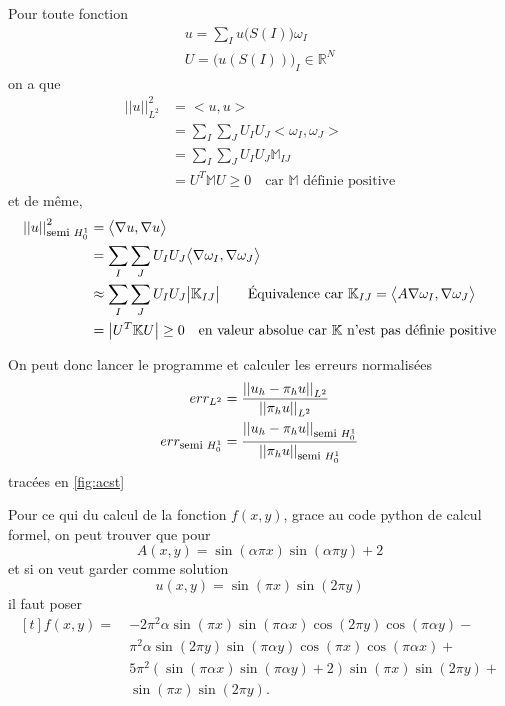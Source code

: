 \documentclass[11pt]{article}
\newcommand{\smbox}[1]{\mbox{\footnotesize #1}}
\newcommand{\R}{\mathbb{R}}
\newcommand{\K}{\mathbb{K}}
\newcommand{\M}{\mathbb{M}}
\newcommand{\norm}[1]{\left|\left|#1\right|\right|}
\begin{document}
Pour toute fonction
\begin{align}
  u = \sum_I u\big(S(I)\big) \omega_I \\
  U = \big(u(S(I))\big)_I \in \R^{ N}
\end{align}
on a que
\begin{align}
  \norm{u}_{L^2}^2 &= \big<u, u\big> \\
                   &= \sum_I \sum_J U_I U_J \big< \omega_I, \omega_J\big> \\
                   &= \sum_I \sum_J U_I U_J \M_{IJ} \\
                   &= U^T \M U \geq 0 \quad \text{car $\M$ définie positive}
\end{align}
et de même, 
\begin{align}
  \norm{u}_{\smbox{semi~} H^1_0}^2
  &= \big<\nabla u, \nabla u\big> \\
  &= \sum_I \sum_J U_I U_J \big<\nabla \omega_I, \nabla \omega_J\big> \\
  &\approx \sum_I \sum_J U_I U_J \big| \K_{IJ} \big| \quad \quad \text{Équivalence car } \K_{IJ} = \big<A \nabla \omega_I, \nabla \omega_J \big> \\
  &= \big|U^T \K U \big| \geq 0 \quad \text{en valeur absolue car } \K \text{ n'est pas définie positive}
\end{align}

On peut donc lancer le programme et calculer les erreurs normalisées
\begin{align}
  err_{L^2} &= \frac{\norm{u_h-\pi_h u}_{L^2}}{\norm{\pi_h u}_{L^2}} \\
  err_{\smbox{semi~} H^1_0} &= \frac{\norm{u_h-\pi_h u}_{\smbox{semi~}H^1_0}}{\norm{\pi_h u}_{\smbox{semi~}H^1_0}} 
\end{align}
tracées en \autoref{fig:acst}

Pour ce qui du calcul de la fonction $f(x,y)$, grace au code python de calcul formel, on peut trouver que pour
\begin{equation}
  A(x,y)= \sin(\alpha \pi x)\sin(\alpha \pi y) + 2
\end{equation}
et si on veut garder comme solution
\begin{equation}
  u(x,y)=\sin(\pi x)\sin(2\pi y)
\end{equation}
il faut poser
\begin{equation}
  \begin{aligned}[t]
    f(x,y) =~&- 2 \pi^2 \alpha \sin(\pi x) \sin(\pi \alpha x) \cos(2 \pi y) \cos(\pi \alpha y) - \\
    &\pi^2 \alpha \sin(2 \pi y) \sin(\pi \alpha y) \cos(\pi x) \cos(\pi \alpha x) + \\
    &5 \pi^2 (\sin(\pi \alpha x) \sin(\pi \alpha y) + 2) \sin(\pi x) \sin(2 \pi y) + \\
    &\sin(\pi x) \sin(2 \pi y).
  \end{aligned}
\end{equation}
\end{document}
